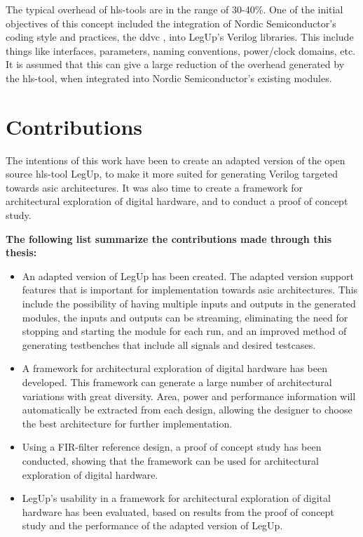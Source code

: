 \begin{enumerate}
 The typical overhead of \gls{hls}-tools are in the range of 30-40\%. One of the initial objectives of this concept included the integration of  Nordic Semiconductor's coding style and practices, the \gls{ddvc} \cite{nordicddvc}, into LegUp's Verilog libraries. This include things like interfaces, parameters, naming conventions, power/clock domains, etc. It is assumed that this can give a large reduction of the overhead generated by the \gls{hls}-tool, when integrated into Nordic Semiconductor's existing modules.
\end{enumerate}

\section{Contributions}
The intentions of this work have been to create an adapted version of the open source \gls{hls}-tool LegUp, to make it more suited for generating Verilog targeted towards \gls{asic} architectures. It was also time to create a framework for architectural exploration of digital hardware, and to conduct a proof of concept study.

\textbf{The following list summarize the contributions made through this thesis:}
\begin{itemize}
    \item An adapted version of LegUp has been created. The adapted version support features that is important for implementation towards \gls{asic} architectures. This include the possibility of having multiple inputs and outputs in the generated modules, the inputs and outputs can be streaming, eliminating the need for stopping and starting the module for each run, and an improved method of generating testbenches that include all signals and desired testcases.
    \item A framework for architectural exploration of digital hardware has been developed. This framework can generate a large number of architectural variations with great diversity. Area, power and performance information will automatically be extracted from each design, allowing the designer to choose the best architecture for further implementation.
    \item Using a FIR-filter reference design, a proof of concept study has been conducted, showing that the framework can be used for architectural exploration of digital hardware.
    \item LegUp's usability in a framework for architectural exploration of digital hardware has been evaluated, based on results from the proof of concept study and the performance of the adapted version of LegUp.
\end{itemize}

